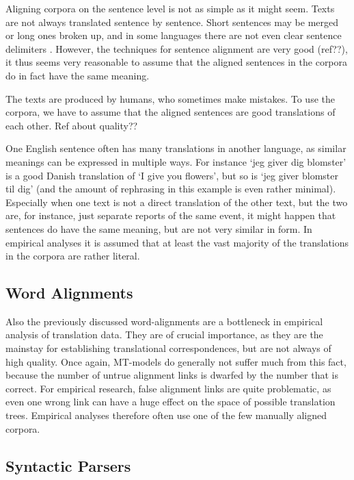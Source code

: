 \documentclass{report}
\begin{document}
Aligning corpora on the sentence level is not as simple as it might seem. Texts are not always translated sentence by sentence. Short sentences may be merged or long ones broken up, and in some languages there are not even clear sentence delimiters \citep[p.55]{koehn2008statistical}. However, the techniques for sentence alignment are very good (ref??), it thus seems very reasonable to assume that the aligned sentences in the corpora do in fact have the same meaning.

The texts are produced by humans, who sometimes make mistakes. To use the corpora, we have to assume that the aligned sentences are good translations of each other. Ref about quality??

One English sentence often has many translations in another language, as similar meanings can be expressed in multiple ways. For instance `jeg giver dig blomster' is a good Danish translation of `I give you flowers', but so is `jeg giver blomster til dig' (and the amount of rephrasing in this example is even rather minimal). Especially when one text is not a direct translation of the other text, but the two are, for instance, just separate reports of the same event, it might happen that sentences do have the same meaning, but are not very similar in form. In empirical analyses it is assumed that at least the vast majority of the translations in the corpora are rather literal.
 
\subsection{Word Alignments}

Also the previously discussed word-alignments are a bottleneck in empirical analysis of translation data. They are of crucial importance, as they are the mainstay for establishing translational correspondences, but are not always of high quality. Once again, MT-models do generally not suffer much from this fact, because the number of untrue alignment links is dwarfed by the number that is correct. For empirical research, false alignment links are quite problematic, as even one wrong link can have a huge effect on the space of possible translation trees. Empirical analyses therefore often use one of the few manually aligned corpora.

\subsection{Syntactic Parsers}
\end{document}
